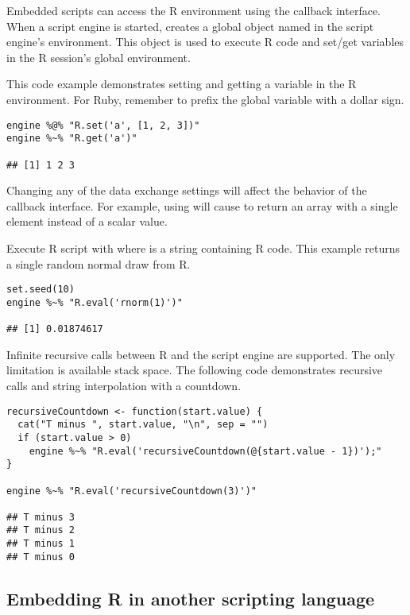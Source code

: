 Embedded scripts can access the R environment using the  callback interface. When a script engine is started,  creates a global object named  in the script engine's environment. This object is used to execute R code and set/get variables in the R session's global environment.

This code example demonstrates setting and getting a variable in the R environment. For Ruby, remember to prefix the global variable  with a dollar sign.

\begin{verbatim}
engine %@% "R.set('a', [1, 2, 3])"
engine %~% "R.get('a')"

## [1] 1 2 3
\end{verbatim}

 Changing any of the data exchange settings will affect the behavior of the callback interface. For example, using  will cause  to return an array with a single element instead of a scalar value.

Execute R script with  where  is a string containing R code. This example returns a single random normal draw from R.

\begin{verbatim}
set.seed(10)
engine %~% "R.eval('rnorm(1)')"

## [1] 0.01874617
\end{verbatim}

Infinite recursive calls between R and the script engine are supported. The only limitation is available stack space. The following code demonstrates recursive calls and string interpolation with a countdown.

\begin{verbatim}
recursiveCountdown <- function(start.value) {
  cat("T minus ", start.value, "\n", sep = "")
  if (start.value > 0)
    engine %~% "R.eval('recursiveCountdown(@{start.value - 1})');"
}

engine %~% "R.eval('recursiveCountdown(3)')"

## T minus 3
## T minus 2
## T minus 1
## T minus 0
\end{verbatim}

\subsection{Embedding R in another scripting language}

